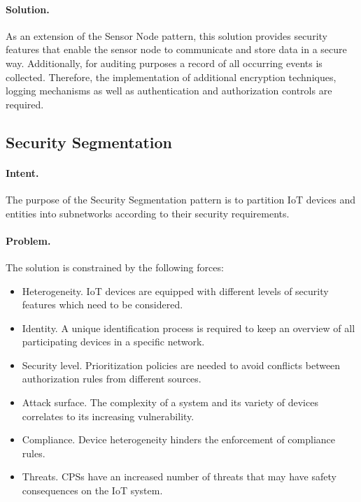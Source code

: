 \paragraph{\textbf{Solution.}} As an extension of the Sensor Node pattern, this solution provides security features that enable the sensor node to communicate and store data in a secure way. Additionally, for auditing purposes a record of all occurring events is collected. Therefore, the implementation of additional encryption techniques, logging mechanisms as well as authentication and authorization controls are required. 


\subsection{Security Segmentation~\cite{Fernandez20201}} 
\label{p:segment}

\paragraph{\textbf{Intent.}} The purpose of the Security Segmentation pattern is to partition IoT devices and entities into subnetworks according to their security requirements.

\paragraph{\textbf{Problem.}} The solution is constrained by the following forces:
\begin{itemize}
	\item Heterogeneity. IoT devices are equipped with different levels of security features which need to be considered.
	\item Identity. A unique identification process is required to keep an overview of all participating devices in a specific network.
	\item Security level. Prioritization policies are needed to avoid conflicts between authorization rules from different sources.
	\item Attack surface. The complexity of a system and its variety of devices correlates to its increasing vulnerability.
	\item Compliance. Device heterogeneity hinders the enforcement of compliance rules.
	\item Threats. CPSs have an increased number of threats that may have safety consequences on the IoT system.
\end{itemize} 


